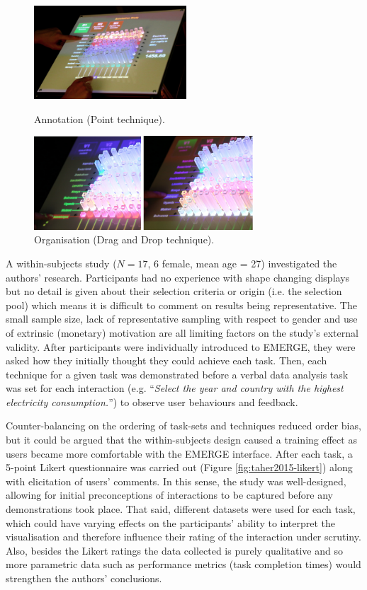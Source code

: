 \documentclass[11pt]{article}
\begin{document}
\begin{figure}[H]
\centering
  \includegraphics[height=3.5cm]{img/taher2015-annotation.png}
  \caption{Annotation (Point technique).}\label{fig:taher2015-annotation}
\endminipage\hfill
{}%
\centering
  \includegraphics[height=3.5cm]{img/taher2015-organize.png}
  \caption{Organisation (Drag and Drop technique).}\label{fig:taher2015-organize}
\endminipage
\end{figure}

A within-subjects study ($N=17$, 6 female, mean age = 27) investigated the authors' research. Participants had no experience with shape changing displays but no detail is given about their selection criteria or origin (i.e. the selection pool) which means it is difficult to comment on results being representative. The small sample size, lack of representative sampling with respect to gender and use of extrinsic (monetary) motivation are all limiting factors on the study's external validity. After participants were individually introduced to EMERGE, they were asked how they initially thought they could achieve each task. Then, each technique for a given task was demonstrated before a verbal data analysis task was set for each interaction (e.g. ``\textit{Select the year and country with the highest electricity consumption.}'') to observe user behaviours and feedback. 

Counter-balancing on the ordering of task-sets and techniques reduced order bias, but it could be argued that the within-subjects design caused a training effect as users became more comfortable with the EMERGE interface. After each task, a 5-point Likert questionnaire was carried out (Figure \ref{fig:taher2015-likert}) along with elicitation of users' comments. In this sense, the study was well-designed, allowing for initial preconceptions of interactions to be captured before any demonstrations took place. That said, different datasets were used for each task, which could have varying effects on the participants' ability to interpret the visualisation and therefore influence their rating of the interaction under scrutiny. Also, besides the Likert ratings the data collected is purely qualitative and so more parametric data such as performance metrics (task completion times) would strengthen the authors' conclusions.
\end{document}
